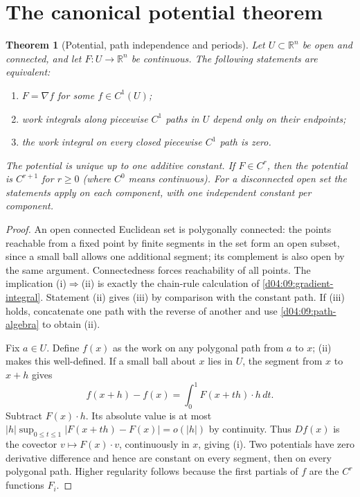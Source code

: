 \documentclass[11pt,oneside,openany]{book}
\newtheorem{theorem}{Theorem}[chapter]
\theoremstyle{definition}
\theoremstyle{remark}
\newcommand{\R}{\mathbb R}
\newcommand{\family}[1]{}
\begin{document}
\section{The canonical potential theorem}
\family{K04.11.06}\family{K04.11.07}\family{K04.11.08}\family{K04.11.09}
\begin{theorem}[Potential, path independence and periods]\label{d04:11:potential}
Let $U\subset\R^n$ be open and connected, and let $F:U\to\R^n$ be
continuous. The following statements are equivalent:
\begin{enumerate}[label=(\roman*)]
\item $F=\nabla f$ for some $f\in C^1(U)$;
\item work integrals along piecewise $C^1$ paths in $U$ depend only on
their endpoints;
\item the work integral on every closed piecewise $C^1$ path is zero.
\end{enumerate}
The potential is unique up to one additive constant. If $F\in C^r$, then
the potential is $C^{r+1}$ for $r\ge0$ (where $C^0$ means continuous).
For a disconnected open set the statements apply on each component, with
one independent constant per component.
\end{theorem}
\begin{proof}
An open connected Euclidean set is polygonally connected: the points
reachable from a fixed point by finite segments in the set form an open
subset, since a small ball allows one additional segment; its complement
is also open by the same argument. Connectedness forces reachability of all
points. The implication (i)$\Rightarrow$(ii) is exactly the chain-rule
calculation of \cref{d04:09:gradient-integral}. Statement (ii) gives (iii)
by comparison with the constant path. If (iii) holds, concatenate one path
with the reverse of another and use \cref{d04:09:path-algebra} to obtain
(ii).

Fix $a\in U$. Define $f(x)$ as the work on any polygonal path from $a$ to
$x$; (ii) makes this well-defined. If a small ball about $x$ lies in $U$,
the segment from $x$ to $x+h$ gives
\[
 f(x+h)-f(x)=\int_0^1 F(x+th)\cdot h\,dt.
\]
Subtract $F(x)\cdot h$. Its absolute value is at most
$|h|\sup_{0\le t\le1}|F(x+th)-F(x)|=o(|h|)$ by continuity. Thus $Df(x)$
is the covector $v\mapsto F(x)\cdot v$, continuously in $x$, giving (i).
Two potentials have zero derivative difference and hence are constant on
every segment, then on every polygonal path. Higher regularity follows
because the first partials of $f$ are the $C^r$ functions $F_i$.
\end{proof}
\end{document}
